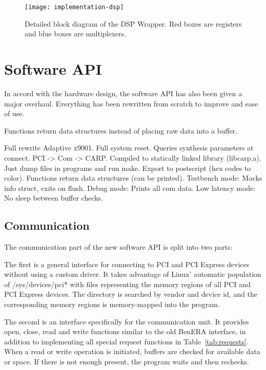 \begin{figure}[!ht]
    \centering
    \texttt{[image: implementation-dsp]}
    \caption[DSP Wrapper]{
        Detailed block diagram of the DSP Wrapper.
        Red boxes are registers and blue boxes are multiplexers.
    }
    \label{fig:implementation-dsp}
\end{figure}


\section{Software API}

In accord with the hardware design, the software API has also been given a major overhaul.
Everything has been rewritten from scratch to improve \TODO and ease of use.

Functions return data structures instead of placing raw data into a buffer.

\TODO
Full rewrite
Adaptive x9001.
Full system reset.
Queries synthesis parameters at connect.
PCI -> Com -> CARP.
Compiled to statically linked library (libcarp.a).
Just dump files in programs and run make.
Export to postscript (hex codes to color).
Functions return data structures (can be printed).
Testbench mode: Mocks info struct, exits on flush.
Debug mode: Prints all com data.
Low latency mode: No sleep between buffer checks.

\subsection{Communication}

The communication part of the new software API is split into two parts:

The first is a general interface for connecting to PCI and PCI Express devices without using a custom driver.
It takes advantage of Linux' automatic population of /sys/devices/pci* with files representing the memory regions of all PCI and PCI Express devices.
The directory is searched by vendor and device id, and the corresponding memory regions is memory-mapped into the program.

The second is an interface specifically for the communication unit.
It provides open, close, read and write functions similar to the old BenERA interface, in addition to implementing all special request functions in Table~\ref{tab:requests}.
When a read or write operation is initiated, buffers are checked for available data or space.
If there is not enough present, the program waits and then rechecks.

